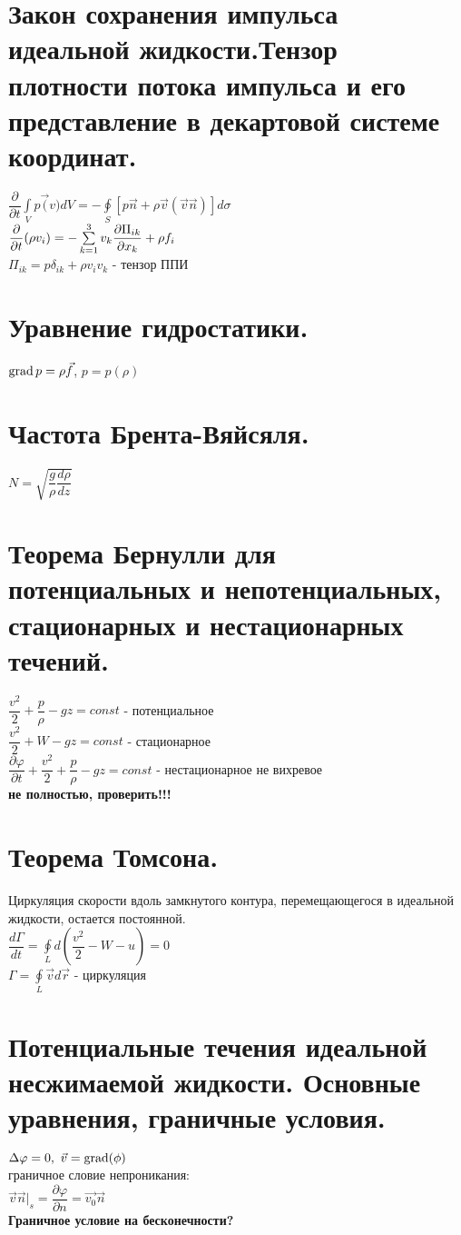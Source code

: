 \begin{multicols*}{4}
		\section{Закон сохранения импульса идеальной жидкости.Тензор плотности потока импульса и его представление в декартовой системе координат.}
		$ \dfrac{\partial}{\partial t}\int\limits_V p\vec(v)dV=-\oint\limits_S \left[p\vec{n}+\rho\vec{v}(\vec{v}\vec{n})\right]d\sigma$ \\
		$ \dfrac{\partial}{\partial t}(\rho v_i)=-\sum\limits_{k=1}^3v_k\dfrac{\partial \Pi_{ik}}{\partial x_k}+\rho f_i $ \\
		$ \Pi_{ik} = p\delta_{ik}+\rho v_iv_k$ - тензор ППИ
		
		\section{Уравнение гидростатики.}
		$\operatorname{grad} p=\rho\vec{f}$, 
		$p=p(\rho)$
		
		\section{Частота Брента-Вяйсяля.}
		$N=\sqrt{\dfrac{g}{\rho}\dfrac{d\rho}{dz}}$
		
		\section{Теорема Бернулли для потенциальных и непотенциальных, стационарных и нестационарных течений.}
		$\dfrac{v^2}{2}+\dfrac{p}{\rho}-gz=const$ - потенциальное \\
		$\dfrac{v^2}{2}+W-gz=const$ - стационарное \\
		$\dfrac{\partial \varphi}{\partial t}+\dfrac{v^2}{2}+\dfrac{p}{\rho}-gz=const$ - нестационарное не вихревое \\
		\textbf{не полностью, проверить!!!}
		
		\section{Теорема Томсона.}
		Циркуляция скорости вдоль замкнутого контура, перемещающегося в идеальной жидкости, остается постоянной. \\
		$\dfrac{d\Gamma}{dt}=\oint\limits_Ld\left(\dfrac{v^2}{2}-W-u\right)=0$ \\
		$\Gamma = \oint\limits_L\vec{v}d\vec{r}$ - циркуляция
		
		\section{Потенциальные течения идеальной несжимаемой жидкости. Основные уравнения, граничные условия.}
		$\Delta \varphi=0,~\vec{v}=\operatorname{grad}(\phi)$ \\
		граничное словие непроникания: \\
		$\vec{v}\vec{n}|_s=\dfrac{\partial\varphi}{\partial n}=\vec{v_0}\vec{n}$ \\
		\textbf{Граничное условие на бесконечности?}
		

\end{multicols*}
